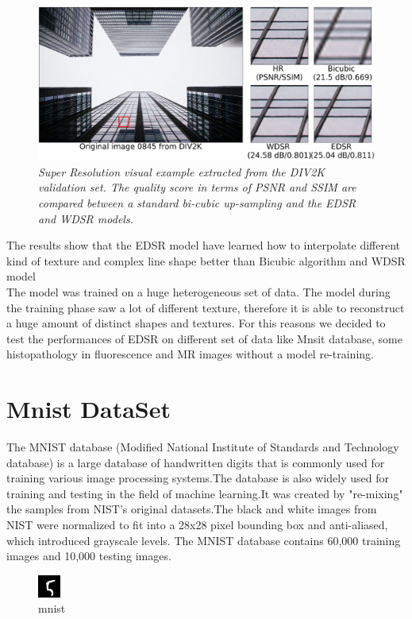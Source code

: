 \documentclass[a4paper, 10pt]{book}
\begin{document}
\begin{figure}[H]
  \includegraphics[scale=0.5]{sr_res3.png}
  \caption{\it Super Resolution visual example extracted from the DIV2K validation set. The quality score in terms of PSNR and SSIM are compared between a standard bi-cubic up-sampling and the EDSR and WDSR models.}
  \label{fig:windows}
\end{figure}
The results show that the EDSR model have learned how to interpolate different kind of texture and complex line shape better than Bicubic algorithm and WDSR model
\\
The model was trained on a huge heterogeneous set of data. The model during the training phase saw a lot of different texture, therefore it is able  to reconstruct a huge amount of distinct shapes and textures. For this reasons we decided to test the performances of   EDSR on 
 different set of data like  Mnsit database, some histopathology in fluorescence and MR images without a model re-training.



\section{Mnist DataSet}
The MNIST database (Modified National Institute of Standards and Technology database) is a large database of handwritten digits that is commonly used for training various image processing systems.The database is also widely used for training and testing in the field of machine learning.It was created by "re-mixing" the samples from NIST's original datasets.The black and white images from NIST were normalized to fit into a 28x28 pixel bounding box and anti-aliased, which introduced grayscale levels.
The MNIST database contains 60,000 training images and 10,000 testing images.
\begin{figure}[H]
    \centering
    \includegraphics[scale=1]{mnist.png}
    \caption{mnist}
    \label{fig:mnist}
\end{figure}
\end{document}
